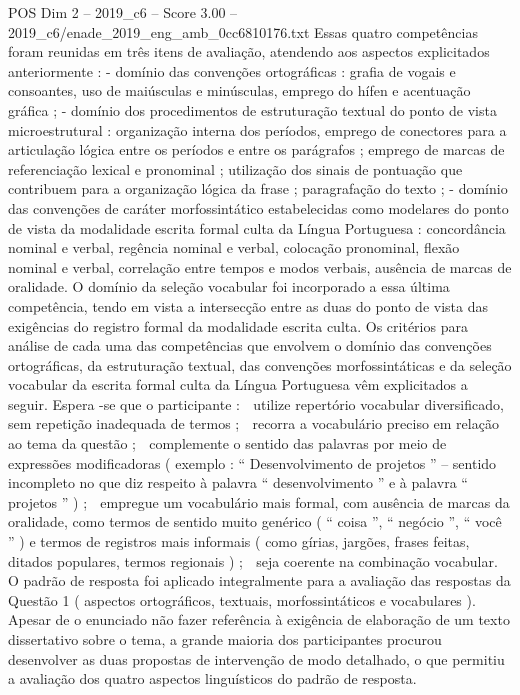 \begin{textsample}{POS Dim 2 – 2019\_c6 – Score 3.00 – 2019\_c6/enade\_2019\_eng\_amb\_0cc6810176.txt}
Essas quatro competências foram reunidas em três itens de avaliação, atendendo aos aspectos explicitados anteriormente : - domínio das convenções ortográficas : grafia de vogais e consoantes, uso de maiúsculas e minúsculas, emprego do hífen e acentuação gráfica ; - domínio dos procedimentos de estruturação textual do ponto de vista microestrutural : organização interna dos períodos, emprego de conectores para a articulação lógica entre os períodos e entre os parágrafos ; emprego de marcas de referenciação lexical e pronominal ; utilização dos sinais de pontuação que contribuem para a organização lógica da frase ; paragrafação do texto ; - domínio das convenções de caráter morfossintático estabelecidas como modelares do ponto de vista da modalidade escrita formal culta da Língua Portuguesa : concordância nominal e verbal, regência nominal e verbal, colocação pronominal, flexão nominal e verbal, correlação entre tempos e modos verbais, ausência de marcas de oralidade.
O domínio da seleção vocabular foi incorporado a essa última competência, tendo em vista a intersecção entre as duas do ponto de vista das exigências do registro formal da modalidade escrita culta.
Os critérios para análise de cada uma das competências que envolvem o domínio das convenções ortográficas, da estruturação textual, das convenções morfossintáticas e da seleção vocabular da escrita formal culta da Língua Portuguesa vêm explicitados a seguir.
Espera -se que o participante :  utilize repertório vocabular diversificado, sem repetição inadequada de termos ;  recorra a vocabulário preciso em relação ao tema da questão ;  complemente o sentido das palavras por meio de expressões modificadoras ( exemplo : “ Desenvolvimento de projetos ” – sentido incompleto no que diz respeito à palavra “ desenvolvimento ” e à palavra “ projetos ” ) ;  empregue um vocabulário mais formal, com ausência de marcas da oralidade, como termos de sentido muito genérico ( “ coisa ”, “ negócio ”, “ você ” ) e termos de registros mais informais ( como gírias, jargões, frases feitas, ditados populares, termos regionais ) ;  seja coerente na combinação vocabular.
O padrão de resposta foi aplicado integralmente para a avaliação das respostas da Questão 1 ( aspectos ortográficos, textuais, morfossintáticos e vocabulares ).
Apesar de o enunciado não fazer referência à exigência de elaboração de um texto dissertativo sobre o tema, a grande maioria dos participantes procurou desenvolver as duas propostas de intervenção de modo detalhado, o que permitiu a avaliação dos quatro aspectos linguísticos do padrão de resposta.

\end{textsample}
